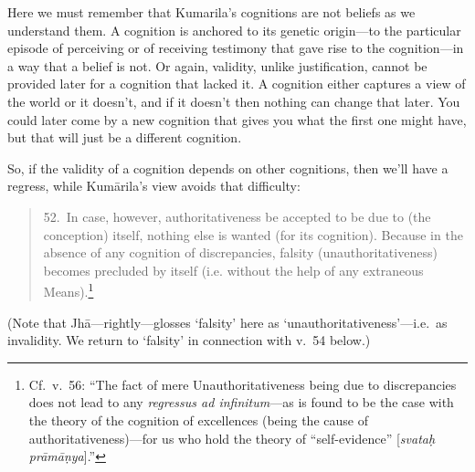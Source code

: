 \documentclass[11pt,letterpaper,oneside]{amsart}
\newenvironment{squote}{\begin{quote}\sf\small}{\rm\end{quote}} %
\begin{document}
Here we must remember that Kumarila's cognitions are not beliefs as we understand them. A cognition is anchored to its genetic origin---to the particular episode of perceiving or of receiving testimony that gave rise to the cognition---in a way that a belief is not. Or again, validity, unlike justification, cannot be provided later for a cognition that lacked it. A cognition either captures a view of the world or it doesn't, and if it doesn't then nothing can change that later. You could later come by a new cognition that gives you what the first one might have, but that will just be a different cognition.

So, if the validity of a cognition depends on other cognitions, then we'll have a regress, while Kum\=arila's view avoids that difficulty:\begin{squote}52.\ In case, however, authoritativeness be accepted to be due to (the conception) itself, nothing else is wanted (for its cognition). Because in the absence of any cognition of discrepancies, falsity (unauthoritativeness) becomes precluded by itself (i.e. without the help of any extraneous Means).\footnote{Cf.\ v.\ 56: ``The fact of mere Unauthoritativeness being due to discrepancies does not lead to any \emph{regressus ad infinitum}---as is found to be the case with the theory of the cognition of excellences (being the cause of authoritativeness)---for us who hold the theory of ``self-evidence'' [\emph{svata\d h pr\=am\=a\d nya}].''}\end{squote} (Note that Jh\=a---rightly---glosses `falsity' here as `unauthoritativeness'---i.e.\ as invalidity. We return to `falsity' in connection with v.\ 54 below.)
\end{document}
